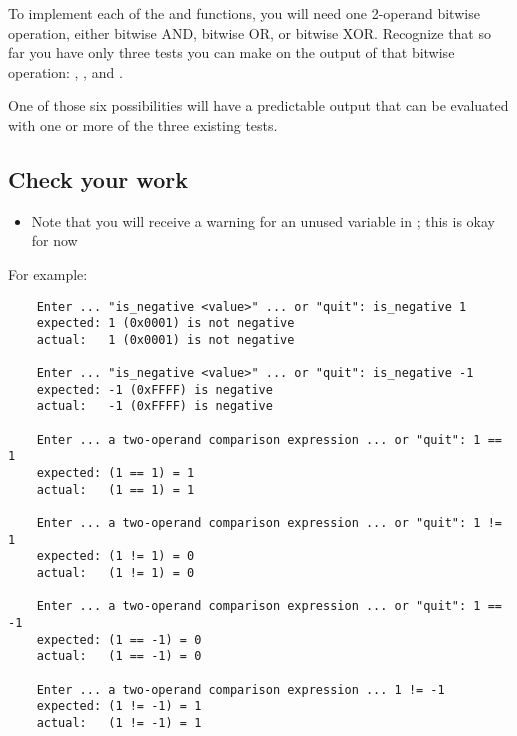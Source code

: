 To implement each of the  and  functions, you will need one 2-operand bitwise operation, either bitwise AND, bitwise OR, or bitwise XOR\@.
Recognize that so far you have only three tests you can make on the output of that bitwise operation: , , and .
\begin{description}
\end{description}
One of those six possibilities will have a predictable output that can be evaluated with one or more of the three existing tests.
\begin{description}
\end{description}

\subsection*{Check your work}

\begin{description}
    \begin{itemize}
        \item Note that you will receive a warning for an unused variable in ;
            this is okay for now
    \end{itemize}
\end{description}
For example:
\begin{verbatim}
    Enter ... "is_negative <value>" ... or "quit": is_negative 1
    expected: 1 (0x0001) is not negative
    actual:   1 (0x0001) is not negative

    Enter ... "is_negative <value>" ... or "quit": is_negative -1
    expected: -1 (0xFFFF) is negative
    actual:   -1 (0xFFFF) is negative

    Enter ... a two-operand comparison expression ... or "quit": 1 == 1
    expected: (1 == 1) = 1
    actual:   (1 == 1) = 1

    Enter ... a two-operand comparison expression ... or "quit": 1 != 1
    expected: (1 != 1) = 0
    actual:   (1 != 1) = 0

    Enter ... a two-operand comparison expression ... or "quit": 1 == -1
    expected: (1 == -1) = 0
    actual:   (1 == -1) = 0

    Enter ... a two-operand comparison expression ... 1 != -1
    expected: (1 != -1) = 1
    actual:   (1 != -1) = 1
\end{verbatim}

